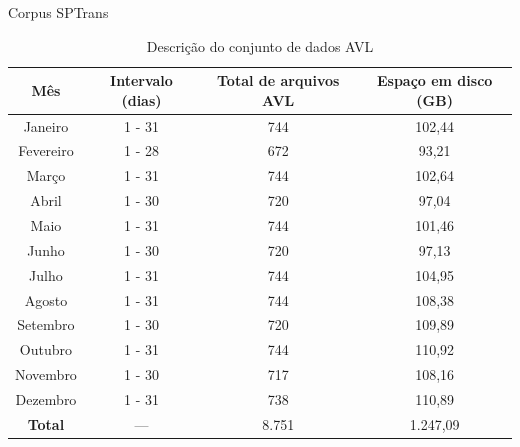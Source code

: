 \documentclass{beamer}
\begin{document}
\begin{frame}{Corpus SPTrans}
\begin{table}[!htb]
\begin{adjustbox}{max height=10mm, width=4in}
\begin{threeparttable}
\centering
\caption{Descrição do conjunto de dados AVL}
\label{tab:avlDataset}
\begin{tabular}{ c | c | c | c }
\toprule
\textbf{Mês} & \textbf{Intervalo (dias)} & \textbf{Total de arquivos AVL} & \textbf{Espaço em disco (GB)} \\
\midrule
Janeiro\tnote{a} & 1 - 31 & 744 & 102,44 \\
\hline
 Fevereiro & 1 - 28 & 672 & 93,21 \\
\hline
 Março & 1 - 31 & 744 & 102,64 \\
\hline
 Abril & 1 - 30 & 720 & 97,04 \\
\hline
 Maio & 1 - 31 & 744 & 101,46 \\
\hline
 Junho & 1 - 30 & 720 & 97,13 \\
\hline
 Julho & 1 - 31 & 744 & 104,95 \\
\hline
 Agosto & 1 - 31 & 744 & 108,38 \\
\hline
 Setembro & 1 - 30 & 720 & 109,89 \\
\hline
 Outubro & 1 - 31 & 744 & 110,92 \\
\hline
 Novembro & 1 - 30 & 717 & 108,16 \\
\hline
 Dezembro & 1 - 31 & 738 & 110,89 \\
\midrule
\midrule
\textbf{\alert{Total}} & --- & \alert{8.751} & \alert{1.247,09} \\
\bottomrule
\end{tabular}
\begin{tablenotes}

\end{tablenotes}
\end{threeparttable}
\end{adjustbox}
\end{table}
\end{frame}
\end{document}
